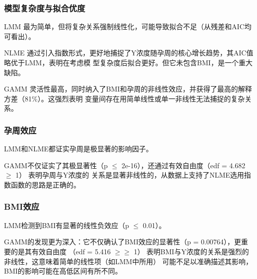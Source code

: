 \documentclass{article}
\begin{document}
\subsubsection{\textbf{模型复杂度与拟合优度}}
LMM 最为简单，但将复杂关系强制线性化，可能导致拟合不足（从残差和AIC均可看出）。

NLME 通过引入指数形式，更好地捕捉了Y浓度随孕周的核心增长趋势，其AIC值略优于LMM，表明在考虑模
型复杂度后拟合更好。但它未包含BMI，是一个重大缺陷。

GAMM 灵活性最高，同时纳入了BMI和孕周的非线性效应，并获得了最高的解释方差（81\%）。这强烈表明
变量间存在用简单线性或单一非线性无法捕捉的复杂关系。

\subsubsection{\textbf{孕周效应}}
LMM和NLME都证实孕周是极显著的影响因子。

GAMM不仅证实了其极显著性（p $\leq$ 2e-16），还通过有效自由度（edf = 4.682 $\geq$ 1） 表明孕周与Y浓度的
关系是显著非线性的，从数据上支持了NLME选用指数函数的思路是正确的。

\subsubsection{\textbf{BMI效应}}

LMM检测到BMI有显著的线性负效应（p $\leq$ 0.01）。

GAMM的发现更为深入：它不仅确认了BMI效应的显著性（p = 0.00764），更重要的是其有效自由度
（edf = 5.416 $\geq\geq$ 1） 表明BMI与Y浓度的关系是强烈的非线性，这意味着简单的线性项（如LMM中所用）
可能不足以准确描述其影响，BMI的影响可能在高低区间有所不同。
\end{document}
